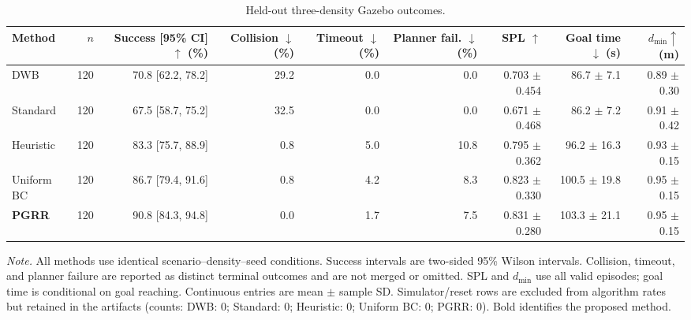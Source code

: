 \begin{table}[t]
\caption{Held-out three-density Gazebo outcomes.}
\label{tab:moderate-main-results}
\centering
\footnotesize
\setlength{\tabcolsep}{3.3pt}
\renewcommand{\arraystretch}{1.08}
\begin{tabular}{@{}lrrrrrrrr@{}}
\toprule
Method & $n$ & Success [95\% CI] $\uparrow$ (\%) & Collision $\downarrow$ (\%)
& Timeout $\downarrow$ (\%) & Planner fail. $\downarrow$ (\%) & SPL $\uparrow$
& Goal time $\downarrow$ (s) & $d_{\min}\uparrow$ (m) \\
\midrule
DWB & 120 & 70.8 [62.2, 78.2] & 29.2 & 0.0 & 0.0 & 0.703 $\pm$ 0.454 & 86.7 $\pm$ 7.1 & 0.89 $\pm$ 0.30 \\
Standard & 120 & 67.5 [58.7, 75.2] & 32.5 & 0.0 & 0.0 & 0.671 $\pm$ 0.468 & 86.2 $\pm$ 7.2 & 0.91 $\pm$ 0.42 \\
Heuristic & 120 & 83.3 [75.7, 88.9] & 0.8 & 5.0 & 10.8 & 0.795 $\pm$ 0.362 & 96.2 $\pm$ 16.3 & 0.93 $\pm$ 0.15 \\
Uniform BC & 120 & 86.7 [79.4, 91.6] & 0.8 & 4.2 & 8.3 & 0.823 $\pm$ 0.330 & 100.5 $\pm$ 19.8 & 0.95 $\pm$ 0.15 \\
\textbf{PGRR} & 120 & 90.8 [84.3, 94.8] & 0.0 & 1.7 & 7.5 & 0.831 $\pm$ 0.280 & 103.3 $\pm$ 21.1 & 0.95 $\pm$ 0.15 \\
\bottomrule
\end{tabular}
\vspace{2pt}

\parbox{0.98\textwidth}{\footnotesize \emph{Note.} All methods use identical
scenario--density--seed conditions. Success intervals are two-sided 95\% Wilson intervals.
Collision, timeout, and planner failure are reported as distinct terminal outcomes and are not
merged or omitted. SPL and $d_{\min}$ use all valid episodes; goal time is conditional on
goal reaching. Continuous entries are mean $\pm$ sample SD. Simulator/reset rows are excluded
from algorithm rates but retained in the artifacts (counts: DWB: 0; Standard: 0; Heuristic: 0; Uniform BC: 0; PGRR: 0). Bold identifies the proposed method.}
\end{table}
